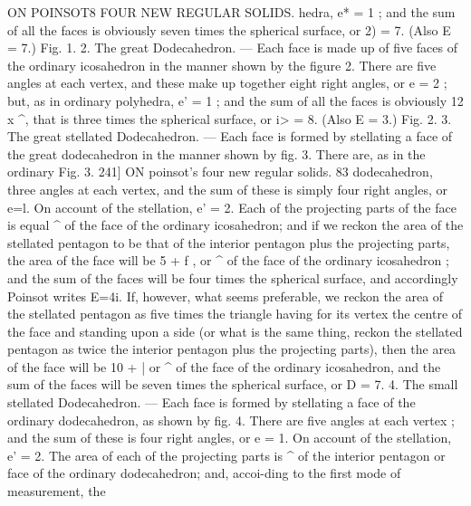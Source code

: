 \documentclass[11pt,a4paper]{book}
\begin{document}
ON    POINSOT8  FOUR   NEW    REGULAR   SOLIDS.
hedra,   e*  =  1 ;    and  the    sum    of   all    the    faces    is    obviously  seven    times    the    spherical
surface,  or  2)  =  7.     (Also  E  =  7.)
Fig.  1.
2.  The  great  Dodecahedron. — Each  face  is  made  up  of  five  faces  of  the  ordinary
icosahedron  in  the  manner  shown  by  the  figure  2.  There  are  five  angles  at  each
vertex,  and  these  make  up  together  eight  right  angles,  or  e  =  2 ;  but,  as  in  ordinary
polyhedra,  e'  =  1 ;  and  the  sum  of  all  the  faces  is  obviously  12  x  ^,  that  is  three
times  the  spherical  surface,  or  i>  =  8.     (Also  E  =  3.)
Fig.  2.
3.     The  great  stellated  Dodecahedron. — Each   face   is   formed   by  stellating  a  face  of
the   great   dodecahedron   in   the  manner  shown  by  fig.   3.     There  are,  as  in  the  ordinary
Fig.  3.
241]  ON  poinsot's  four  new  regular  solids.  83
dodecahedron,  three  angles  at  each  vertex,  and  the  sum  of  these  is  simply  four  right
angles,  or  e=l.  On  account  of  the  stellation,  e'  =  2.  Each  of  the  projecting  parts  of
the  face  is  equal  ^  of  the  face  of  the  ordinary  icosahedron;  and  if  we  reckon  the
area  of  the  stellated  pentagon  to  be  that  of  the  interior  pentagon  plus  the  projecting
parts,  the  area  of  the  face  will  be  5  +  f ,  or  ^  of  the  face  of  the  ordinary  icosahedron ;
and  the  sum  of  the  faces  will  be  four  times  the  spherical  surface,  and  accordingly
Poinsot  writes  E=4i.  If,  however,  what  seems  preferable,  we  reckon  the  area  of  the
stellated  pentagon  as  five  times  the  triangle  having  for  its  vertex  the  centre  of  the
face  and  standing  upon  a  side  (or  what  is  the  same  thing,  reckon  the  stellated
pentagon  as  twice  the  interior  pentagon  plus  the  projecting  parts),  then  the  area  of
the  face  will  be  10 +  |  or  ^  of  the  face  of  the  ordinary  icosahedron,  and  the  sum
of  the  faces  will  be  seven  times  the  spherical  surface,  or  D  =  7.
4.  The  small  stellated  Dodecahedron. — Each  face  is  formed  by  stellating  a  face  of
the  ordinary  dodecahedron,  as  shown  by  fig.  4.  There  are  five  angles  at  each  vertex ;
and  the  sum  of  these  is  four  right  angles,  or  e  =  1.  On  account  of  the  stellation,
e'  =  2.  The  area  of  each  of  the  projecting  parts  is  ^  of  the  interior  pentagon  or  face
of  the   ordinary   dodecahedron;    and,   accoi-ding   to   the   first   mode   of    measurement,   the
\end{document}
